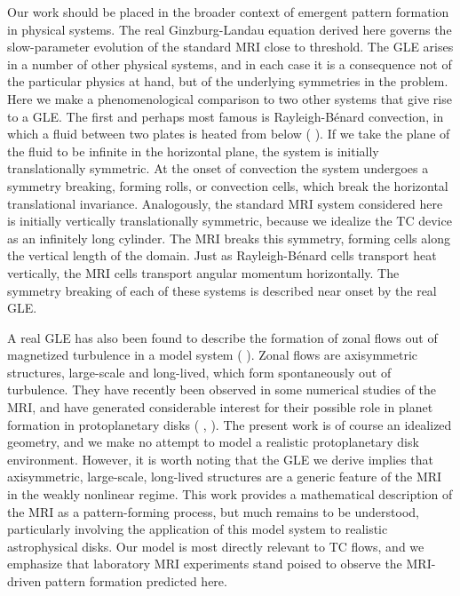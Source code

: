 \documentclass{emulateapj}
\newcommand{\citei}[1]{\citeauthor{#1} \citeyear{#1}}
\begin{document}
Our work should be placed in the broader context of emergent pattern formation in physical systems. The real Ginzburg-Landau equation derived here governs the slow-parameter evolution of the standard MRI close to threshold. The GLE arises in a number of other physical systems, and in each case it is a consequence not of the particular physics at hand, but of the underlying symmetries in the problem. Here we make a phenomenological comparison to two other systems that give rise to a GLE. The first and perhaps most famous is Rayleigh-B\'enard convection, in which a fluid between two plates is heated from below (\citei{Newell:1969wr}). If we take the plane of the fluid to be infinite in the horizontal plane, the system is initially translationally symmetric. %
At the onset of convection the system undergoes a symmetry breaking, forming rolls, or convection cells, which break the horizontal translational invariance. Analogously, the standard MRI system considered here is initially vertically translationally symmetric, because we idealize the TC device as an infinitely long cylinder. The MRI breaks this symmetry, forming cells along the vertical length of the domain. Just as Rayleigh-B\'enard cells transport heat vertically, the MRI cells transport angular momentum horizontally. The symmetry breaking of each of these systems is described near onset by the real GLE. 

A real GLE has also been found to describe the formation of zonal flows out of magnetized turbulence in a model system (\citei{Parker:2013hy}). Zonal flows are axisymmetric structures, large-scale and long-lived, which form spontaneously out of turbulence. They have recently been observed in some numerical studies of the MRI, and have generated considerable interest for their possible role in planet formation in protoplanetary disks (\citei{Johansen:2009uj}, \citei{Kunz:2013}). The present work is of course an idealized geometry, and we make no attempt to model a realistic protoplanetary disk environment. However, it is worth noting that the GLE we derive implies that axisymmetric, large-scale, long-lived structures are a generic feature of the MRI in the weakly nonlinear regime. This work provides a mathematical description of the MRI as a pattern-forming process, but much remains to be understood, particularly involving the application of this model system to realistic astrophysical disks. Our model is most directly relevant to TC flows, and we emphasize that laboratory MRI experiments stand poised to observe the MRI-driven pattern formation predicted here. 
\end{document}
